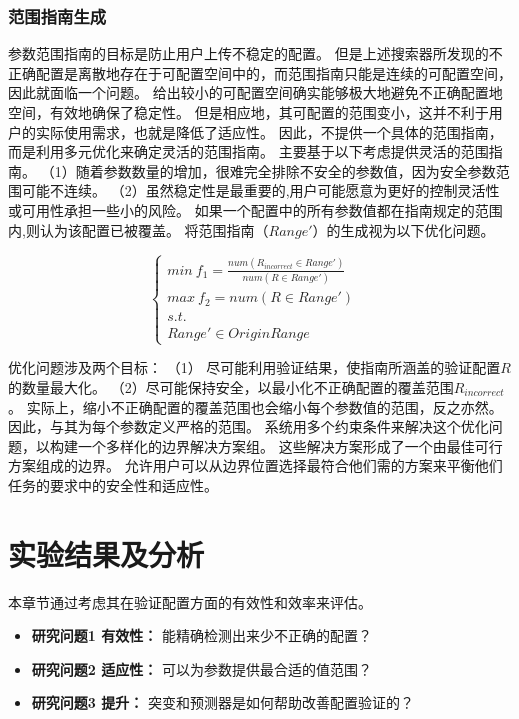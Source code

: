 \subsubsection{范围指南生成} 
参数范围指南的目标是防止用户上传不稳定的配置。
但是上述搜索器所发现的不正确配置是离散地存在于可配置空间中的，而范围指南只能是连续的可配置空间，因此就面临一个问题。
给出较小的可配置空间确实能够极大地避免不正确配置地空间，有效地确保了稳定性。
但是相应地，其可配置的范围变小，这并不利于用户的实际使用需求，也就是降低了适应性。
因此，\icsearcher 不提供一个具体的范围指南，而是利用多元优化来确定灵活的范围指南。
\icsearcher 主要基于以下考虑提供灵活的范围指南。
（1）随着参数数量的增加，很难完全排除不安全的参数值，因为安全参数范围可能不连续。
（2）虽然稳定性是最重要的,用户可能愿意为更好的控制灵活性或可用性承担一些小的风险。
如果一个配置中的所有参数值都在指南规定的范围内,则认为该配置已被覆盖。
\icsearcher 将范围指南（$Range'$）的生成视为以下优化问题。

\begin{equation}
\begin{cases}
        min~f_1 = \frac{num(R_{incorrect } \in Range')}{num(R \in Range')}   \\
       max~f_2 = num(R \in Range')  \\
       s.t. &\\
       Range' \in OriginRange
\end{cases}
\label{eq1}
\end{equation} 

优化问题涉及两个目标：
（1） 尽可能利用验证结果，使指南所涵盖的验证配置$R$的数量最大化。
（2）尽可能保持安全，以最小化不正确配置的覆盖范围$R_{incorrect}$。
实际上，缩小不正确配置的覆盖范围也会缩小每个参数值的范围，反之亦然。
因此，与其为每个参数定义严格的范围。
系统用多个约束条件来解决这个优化问题，以构建一个多样化的边界解决方案组。
这些解决方案形成了一个由最佳可行方案组成的边界。
允许用户可以从边界位置选择最符合他们需的方案来平衡他们任务的要求中的安全性和适应性。 



\section{实验结果及分析}
本章节通过考虑其在验证配置方面的有效性和效率来评估\icsearcher 。
\begin{itemize}
 
\item \textbf{研究问题1 有效性：} \icsearcher 能精确检测出来少不正确的配置？

\item \textbf{研究问题2 适应性：} \icsearcher 可以为参数提供最合适的值范围？

\item \textbf{研究问题3 提升：} 突变和预测器是如何帮助改善配置验证的？

\end{itemize}

